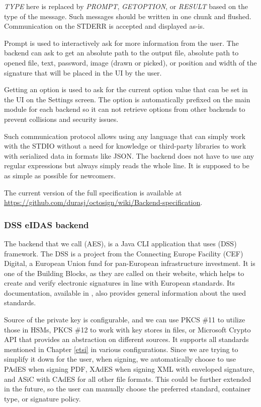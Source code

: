 \documentclass[thesismargins, english, thesislinespacing, onelinechapterstyle, upjsfrontpage]{rnthesis}
\begin{document}
\textit{TYPE} here is replaced by \textit{PROMPT}, \textit{GETOPTION}, or \textit{RESULT} based on the type of the message.
Such messages should be written in one chunk and flushed. Communication on the STDERR is accepted and displayed as-is.

Prompt is used to interactively ask for more information from the user.
The backend can ask to get an absolute path to the output file, absolute path to opened file, text, password, image (drawn or picked), or position and width of the signature that will be placed in the UI by the user.

Getting an option is used to ask for the current option value that can be set in the UI on the Settings screen.
The option is automatically prefixed on the main module for each backend so it can not retrieve options from other backends to prevent collisions and security issues.

Such communication protocol allows using any language that can simply work with the STDIO without a need for knowledge or third-party libraries to work with serialized data in formats like JSON.
The backend does not have to use any regular expressions but always simply reads the whole line.
It is supposed to be as simple as possible for newcomers.

The current version of the full specification is available at \url{https://github.com/durasj/octosign/wiki/Backend-specification}.

\subsubsection{DSS eIDAS backend}

The backend that we call  (AES), is a Java CLI application that uses  (DSS) framework. 
The DSS is a project from the Connecting Europe Facility (CEF) Digital, a European Union fund for pan-European infrastructure investment.
It is one of the \textit{}{Building Blocks}, as they are called on their website, which helps to create and verify electronic signatures in line with European standards.
Its documentation, available in \cite{ecdss}, also provides general information about the used standards.

Source of the private key is configurable, and we can use PKCS \#11 to utilize those in HSMs, PKCS \#12 to work with key stores in files, or Microsoft Crypto API that provides an abstraction on different sources.
It supports all standards mentioned in Chapter \ref{etsi} in various configurations.
Since we are trying to simplify it down for the user, when signing, we automatically choose to use PAdES when signing PDF, XAdES when signing XML with enveloped signature, and ASiC with CAdES for all other file formats.
This could be further extended in the future, so the user can manually choose the preferred standard, container type, or signature policy.
\end{document}
